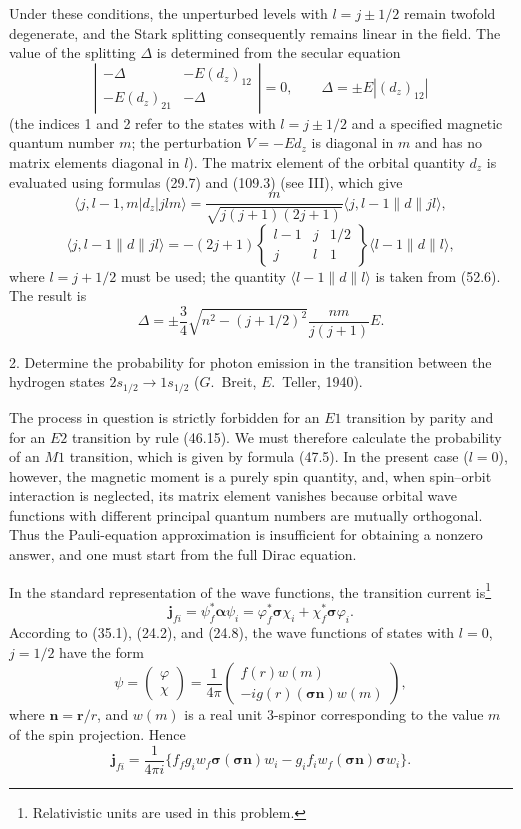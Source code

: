 \SolutionHeading Under these conditions, the unperturbed levels with $l=j\pm1/2$ remain twofold degenerate, and the Stark splitting consequently remains linear in the field. The value of the splitting $\Delta$ is determined from the secular equation
\[
\left|\begin{matrix}
-\Delta&-E(d_z)_{12}\\
-E(d_z)_{21}&-\Delta
\end{matrix}\right|=0,
\qquad
\Delta=\pm E|(d_z)_{12}|
\]
(the indices 1 and 2 refer to the states with $l=j\pm1/2$ and a specified magnetic quantum number $m$; the perturbation $V=-Ed_z$ is diagonal in $m$ and has no matrix elements diagonal in $l$). The matrix element of the orbital quantity $d_z$ is evaluated using formulas (29.7) and (109.3) (see III), which give
\[
\langle j,l-1,m|d_z|jlm\rangle
=\frac{m}{\sqrt{j(j+1)(2j+1)}}\langle j,l-1\|d\|jl\rangle,
\]
\[
\langle j,l-1\|d\|jl\rangle
=-(2j+1)\begin{Bmatrix}l-1&j&1/2\\j&l&1\end{Bmatrix}
\langle l-1\|d\|l\rangle,
\]
where $l=j+1/2$ must be used; the quantity $\langle l-1\|d\|l\rangle$ is taken from (52.6). The result is
\[
\Delta=\pm\frac34\sqrt{n^2-(j+1/2)^2}\frac{nm}{j(j+1)}E.
\]

2. Determine the probability for photon emission in the transition between the hydrogen states $2s_{1/2}\to1s_{1/2}$ ($G$.~Breit, $E$.~Teller, 1940).

\SolutionHeading The process in question is strictly forbidden for an $E1$ transition by parity and for an $E2$ transition by rule (46.15). We must therefore calculate the probability of an $M1$ transition, which is given by formula (47.5). In the present case ($l=0$), however, the magnetic moment is a purely spin quantity, and, when spin--orbit interaction is neglected, its matrix element vanishes because orbital wave functions with different principal quantum numbers are mutually orthogonal. Thus the Pauli-equation approximation is insufficient for obtaining a nonzero answer, and one must start from the full Dirac equation.

In the standard representation of the wave functions, the transition current is\footnote{Relativistic units are used in this problem.}
\[
\mathbf j_{fi}=\psi_f^*\boldsymbol\alpha\psi_i
=\varphi_f^*\boldsymbol\sigma\chi_i+\chi_f^*\boldsymbol\sigma\varphi_i.
\]
According to (35.1), (24.2), and (24.8), the wave functions of states with $l=0$, $j=1/2$ have the form
\[
\psi=\begin{pmatrix}\varphi\\\chi\end{pmatrix}
=\frac1{4\pi}\begin{pmatrix}f(r)w(m)\\-ig(r)(\boldsymbol\sigma\mathbf n)w(m)\end{pmatrix},
\]
where $\mathbf n=\mathbf r/r$, and $w(m)$ is a real unit 3-spinor corresponding to the value $m$ of the spin projection. Hence
\[
\mathbf j_{fi}=\frac1{4\pi i}
\{f_fg_iw_f\boldsymbol\sigma(\boldsymbol\sigma\mathbf n)w_i
-g_if_iw_f(\boldsymbol\sigma\mathbf n)\boldsymbol\sigma w_i\}.
\]

